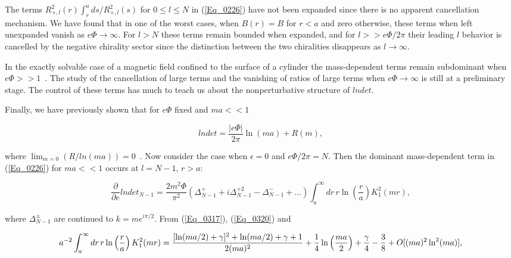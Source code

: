 \documentclass[a4paper,twocolumn,showpacs,preprintnumbers,amsmath,amssymb]{revtex4}
\newcommand{\pdo}[1]{\ensuremath{\frac{\partial }
        {\partial #1 }}}
\begin{document}
The terms $R^2_{+,l}(r) \int^a_r ds / R^2_{+,l}(s)$ for $0 \le l \le
N$ in (\ref{Eq_0226}) have not been expanded since there is no
apparent cancellation mechanism. We have found that in one of the
worst cases, when $B(r) = B$ for $r < a$ and zero otherwise, these
terms when left unexpanded vanish as $e\Phi \to \infty$. For $l > N$
these terms remain bounded when expanded, and for $l >> e\Phi/2\pi$
their leading $l$ behavior is cancelled by the negative chirality
sector since the distinction between the two chiralities disappears as
$l \to \infty$.

In the exactly solvable case of a magnetic field confined to the
surface of a cylinder the mass-dependent terms remain subdominant when
$e\Phi >> 1$~\cite{Fry95}. The study of the cancellation of large
terms and the vanishing of ratios of large terms when $e\Phi \to
\infty$ is still at a preliminary stage. The control of these terms
has much to teach us about the nonperturbative structure of $lndet$.

Finally, we have previously shown that for $e\Phi$ fixed and $ma << 1$

\begin{equation}
\label{Eq_0407}
lndet = \frac{|e\Phi|}{2\pi} \ln(ma) + R(m),
\end{equation}

\noindent
where $\lim_{m=0}(R/ln(ma)) = 0$~\cite{Fry00b}. Now consider the case when
$\epsilon = 0$ and $e\Phi/2\pi = N$. Then the dominant mass-dependent
term in (\ref{Eq_0226}) for $ma << 1$ occurs at $l = N-1$, $r > a$:

\begin{widetext}
\begin{equation}
\label{Eq_0408}
\pdo{e}lndet_{N-1}
  = \frac{2m^2\Phi}{\pi^2}
    (\Delta^{+}_{N-1} + i\Delta^{+ 2}_{N-1} - \Delta^{-}_{N-1} + ...)
    \int^{\infty}_a dr \, r \ln\left(\frac{r}{a}\right) K^2_1(mr), 
\end{equation}
\end{widetext}

\noindent
where $\Delta^{\pm}_{N-1}$ are continued to $k = me^{i\pi/2}$. From
(\ref{Eq_0317}), (\ref{Eq_0320}) and

\begin{widetext}
\begin{equation}
\label{Eq_0409}
a^{-2} \int^{\infty}_a dr \, r \ln\left(\frac{r}{a}\right) K^2_1(mr)\\[3mm]
  = \frac{[\ln(ma/2) + \gamma]^2 + \ln (ma/2) + \gamma + 1}{2(ma)^2}
  + \frac{1}{4} \ln\left(\frac{ma}{2}\right)
  + \frac{\gamma}{4} - \frac{3}{8} + O[(ma)^2\ln^2(ma)],
\end{equation}
\end{widetext}
\end{document}

